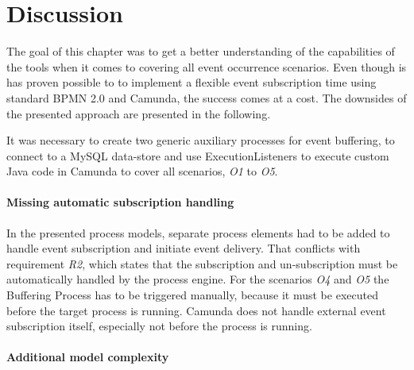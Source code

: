 


\section{Discussion}
The goal of this chapter was to get a better understanding of the capabilities of the tools when it comes to covering all event occurrence scenarios. 
Even though is has proven possible to to implement a flexible event subscription time using standard BPMN 2.0 and Camunda, the success comes at a cost.
The downsides of the presented approach are presented in the following.

It was necessary to create two generic auxiliary processes for event buffering, to connect to a MySQL data-store and use ExecutionListeners to execute custom Java code in Camunda to cover all scenarios, \textit{O1} to \textit{O5}.



\paragraph{Missing automatic subscription handling\newline}

In the presented process models, separate process elements had to be added to handle event subscription and initiate event delivery. 
That conflicts with requirement \textit{R2}, which states that the subscription and un-subscription must be automatically handled by the process engine.
For the scenarios \textit{O4} and \textit{O5} the Buffering Process has to be triggered manually, because it must be executed before the target process is running. Camunda does not handle external event subscription itself, especially not before the process is running.

\paragraph{Additional model complexity\newline}

